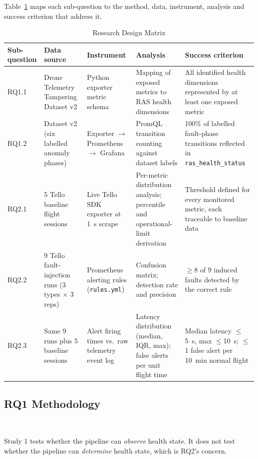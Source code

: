 Table~\ref{tab:design-matrix} maps each sub-question to the method, data,
instrument, analysis and success criterion that address it.

\begin{table}[htbp]
\centering
\caption{Research Design Matrix}
\label{tab:design-matrix}
\footnotesize
\begin{tabular}{|p{1.4cm}|p{2.6cm}|p{2.6cm}|p{3.1cm}|p{3.4cm}|}
\hline
\textbf{Sub-\newline question} & \textbf{Data source} & \textbf{Instrument} & \textbf{Analysis} & \textbf{Success criterion} \\
\hline
RQ1.1 & Drone Telemetry Tampering Dataset v2 & Python exporter metric schema & Mapping of exposed metrics to RAS health dimensions & All identified health dimensions represented by at least one exposed metric \\
\hline
RQ1.2 & Dataset v2 (six labelled anomaly phases) & Exporter $\rightarrow$ Prometheus $\rightarrow$ Grafana & PromQL transition counting against dataset labels & 100\% of labelled fault-phase transitions reflected in \texttt{ras\_health\_status} \\
\hline
RQ2.1 & 5 Tello baseline flight sessions & Live Tello SDK exporter at \SI{1}{\second} scrape & Per-metric distribution analysis; percentile and operational-limit derivation & Threshold defined for every monitored metric, each traceable to baseline data \\
\hline
RQ2.2 & 9 Tello fault-injection runs (3 types $\times$ 3 reps) & Prometheus alerting rules (\texttt{rules.yml}) & Confusion matrix; detection rate and precision & $\geq$8 of 9 induced faults detected by the correct rule \\
\hline
RQ2.3 & Same 9 runs plus 5 baseline sessions & Alert firing times vs.\ raw telemetry event log & Latency distribution (median, IQR, max); false alerts per unit flight time & Median latency $\leq$\SI{5}{\second}, max $\leq$\SI{10}{\second}; $\leq$1 false alert per \SI{10}{\minute} normal flight \\
\hline
\end{tabular}
\end{table}

\subsection{RQ1 Methodology}~\label{subsec:method-rq1}

Study 1 tests whether the pipeline can \textit{observe} health state. It does not
test whether the pipeline can \textit{determine} health state, which is RQ2's
concern.


